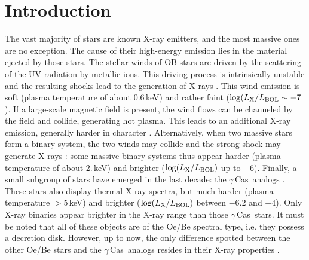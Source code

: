\documentclass[a4paper,fleqn,usenatbib]{mnras}
\newcommand{\gc}{$\gamma$\,Cas}
\begin{document}
\section{Introduction}
The vast majority of stars are known X-ray emitters, and the most massive ones are no exception. The cause of their high-energy emission lies in the material ejected by those stars. The stellar winds of OB stars are driven by the scattering of the UV radiation by metallic ions. This driving process is intrinsically unstable and the resulting shocks lead to the generation of X-rays \citep{fel97}. This wind emission is soft (plasma temperature of about 0.6\,keV) and rather faint ($\log(L_{\rm X}/L_{\rm BOL}\sim -7$). If a large-scale magnetic field is present, the wind flows can be channeled by the field and collide, generating hot plasma. This leads to an additional X-ray emission, generally harder in character \citep{udd16}. Alternatively, when two massive stars form a binary system, the two winds may collide and the strong shock may generate X-rays \citep{rau16}: some massive binary systems thus appear harder (plasma temperature of about 2.\,keV) and brighter ($\log(L_{\rm X}/L_{\rm BOL})$ up to $-6$). Finally, a small subgroup of stars have emerged in the last decade: the \gc\ analogs \citep{smi16}. These stars also display thermal X-ray spectra, but much harder (plasma temperature $>5$\,keV) and brighter ($\log(L_{\rm X}/L_{\rm BOL})$ between $-6.2$ and $-4$). Only X-ray binaries appear brighter in the X-ray range than those \gc\ stars. It must be noted that all of these objects are of the Oe/Be spectral type, i.e. they possess a decretion disk. However, up to now, the only difference spotted between the other Oe/Be stars and the \gc\ analogs resides in their X-ray properties \citep{naz20tess,naz21}.
\end{document}
